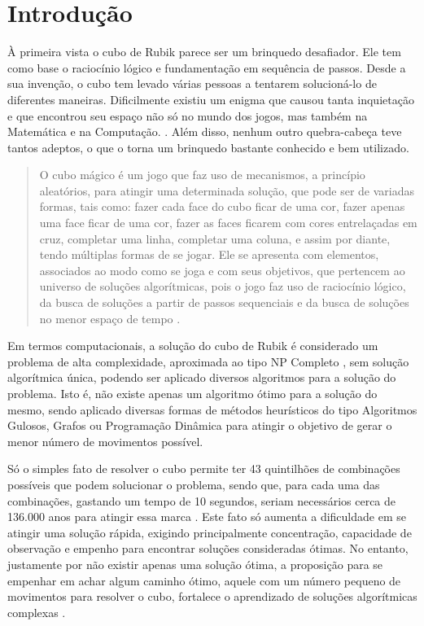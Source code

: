 \chapter{Introdução}

À primeira vista o cubo de Rubik parece ser um brinquedo desafiador. Ele tem como base o raciocínio lógico e fundamentação em sequência de passos. Desde a sua invenção, o cubo tem levado várias pessoas a tentarem solucioná-lo de diferentes maneiras. Dificilmente existiu um enigma que causou tanta inquietação e que encontrou seu espaço não só no mundo dos jogos, mas também na Matemática e na Computação. \cite{knill}. Além disso, nenhum outro quebra-cabeça teve tantos adeptos, o que o torna um brinquedo bastante conhecido e bem utilizado.


\begin{quotation}
O cubo mágico é um jogo que faz uso de mecanismos, a princípio aleatórios, para atingir uma determinada solução, que pode ser de variadas formas, tais como: fazer cada face do cubo ficar de uma cor, fazer apenas uma face ficar de uma cor, fazer as faces ficarem com cores entrelaçadas em cruz, completar uma linha, completar uma coluna, e assim por diante, tendo múltiplas formas de se jogar. Ele se apresenta com elementos, associados ao modo como se joga e com seus objetivos, que pertencem ao universo de soluções algorítmicas, pois o jogo faz uso de raciocínio lógico, da busca de soluções a partir de passos sequenciais e da busca de soluções no menor espaço de tempo \cite{quadros}.
\end{quotation}


Em termos computacionais, a solução do cubo de Rubik é considerado um problema de alta complexidade, aproximada ao tipo NP Completo \cite{cormen}, sem solução algorítmica única, podendo ser aplicado diversos algoritmos para a solução do problema. Isto é, não existe apenas um algoritmo ótimo para a solução do mesmo, sendo aplicado diversas formas de métodos heurísticos do tipo Algoritmos Gulosos, Grafos ou Programação Dinâmica \cite{tardos} para atingir o objetivo de gerar o menor número de movimentos possível.


Só o simples fato de resolver o cubo permite ter 43 quintilhões de combinações possíveis que podem solucionar o problema, sendo que, para cada uma das combinações, gastando um tempo de 10 segundos, seriam necessários cerca de 136.000 anos para atingir essa marca \cite{korf}. Este fato só aumenta a dificuldade em se atingir uma solução rápida, exigindo principalmente concentração, capacidade de observação e empenho para encontrar soluções consideradas ótimas. No entanto, justamente por não existir apenas uma solução ótima, a proposição para se empenhar em achar algum caminho ótimo, aquele com um número pequeno de movimentos para resolver o cubo, fortalece o aprendizado de soluções algorítmicas complexas \cite{quadros}.



